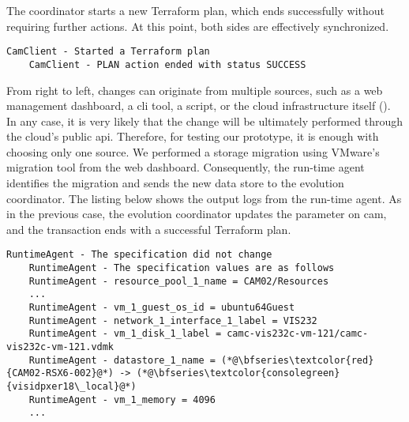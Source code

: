 The coordinator starts a new Terraform plan, which ends successfully without requiring further actions. At this point, both sides are effectively synchronized.

\begin{mdframed}[style=consolestyle]
	\vspace{0.3em}
	\begin{lstlisting}[style=console]
	CamClient - Started a Terraform plan
	CamClient - PLAN action ended with status SUCCESS
	\end{lstlisting}
	\vspace{-0.3em}
\end{mdframed}

From right to left, changes can originate from multiple sources, such as a web management dashboard, a \gls{cli} tool, a script, or the cloud infrastructure itself (). In any case, it is very likely that the change will be ultimately performed through the cloud's public \gls{api}. Therefore, for testing our prototype, it is enough with choosing only one source. We performed a storage migration using VMware's migration tool from the web dashboard. Consequently, the run-time agent identifies the migration and sends the new data store to the evolution coordinator. The listing below shows the output logs from the run-time agent. As in the previous case, the evolution coordinator updates the parameter on \gls{cam}, and the transaction ends with a successful Terraform plan.

\begin{mdframed}[style=consolestyle]
	\vspace{0.3em}
	\begin{lstlisting}[style=console]
	RuntimeAgent - The specification did not change
	RuntimeAgent - The specification values are as follows
	RuntimeAgent - resource_pool_1_name = CAM02/Resources
	...
	RuntimeAgent - vm_1_guest_os_id = ubuntu64Guest
	RuntimeAgent - network_1_interface_1_label = VIS232
	RuntimeAgent - vm_1_disk_1_label = camc-vis232c-vm-121/camc-vis232c-vm-121.vdmk
	RuntimeAgent - datastore_1_name = (*@\bfseries\textcolor{red}{CAM02-RSX6-002}@*) -> (*@\bfseries\textcolor{consolegreen}{visidpxer18\_local}@*)
	RuntimeAgent - vm_1_memory = 4096
	...
	\end{lstlisting}
	\vspace{-0.3em}
\end{mdframed}

